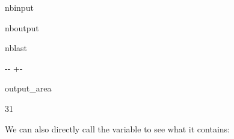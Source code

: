 \documentclass[letterpaper,10pt,english]{sphinxmanual}
\newlength\nbsphinxcodecellspacing
\begin{document}
\begin{sphinxuseclass}{nbinput}
{
\begin{sphinxVerbatim}[commandchars=\\\{\}]
\llap{\color{nbsphinxin}[4]:\,\hspace{\fboxrule}\hspace{\fboxsep}}
\end{sphinxVerbatim}
}

\end{sphinxuseclass}
\begin{sphinxuseclass}{nboutput}
\begin{sphinxuseclass}{nblast}
{

\kern-\sphinxverbatimsmallskipamount\kern-\baselineskip
\kern+\FrameHeightAdjust\kern-\fboxrule
\vspace{\nbsphinxcodecellspacing}

\begin{sphinxuseclass}{output_area}
\begin{sphinxuseclass}{}


\begin{sphinxVerbatim}[commandchars=\\\{\}]
\llap{\color{nbsphinxout}[4]:\,\hspace{\fboxrule}\hspace{\fboxsep}}31
\end{sphinxVerbatim}



\end{sphinxuseclass}
\end{sphinxuseclass}
}

\end{sphinxuseclass}
\end{sphinxuseclass}
\sphinxAtStartPar
We can also directly call the variable  to see what it contains:
\end{document}
